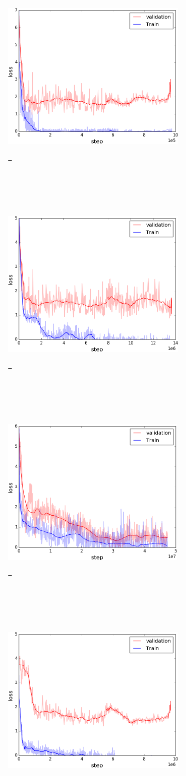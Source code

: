 \begin{figure}[t]
    \centering
    \begin{subfigure}[t]{0.33\textwidth}
        \centering
        \includegraphics[height=3.6cm]{03-part-02/chapter-04/figs_and_tables/loss_step_plots/step_m1f1.png}
        \caption{\label{fig:m1f1}\mone-\fone}
    \end{subfigure}%
    ~
    \begin{subfigure}[t]{0.33\textwidth}
        \centering
        \includegraphics[height=3.6cm]{03-part-02/chapter-04/figs_and_tables/loss_step_plots/step_m1f2.png}
        \caption{\label{fig:m1f2}\mone-\ftwo}
    \end{subfigure}%
    ~
    \begin{subfigure}[t]{0.33\textwidth}
        \centering
        \includegraphics[height=3.6cm]{03-part-02/chapter-04/figs_and_tables/loss_step_plots/step_m1f3.png}
        \caption{\label{fig:m1f3}\mone-\fthree}
    \end{subfigure}%
    \\
    \begin{subfigure}[t]{0.33\textwidth}
        \centering
        \includegraphics[height=3.6cm]{03-part-02/chapter-04/figs_and_tables/loss_step_plots/step_m2f1.png}

\end{subfigure}
\end{figure}

